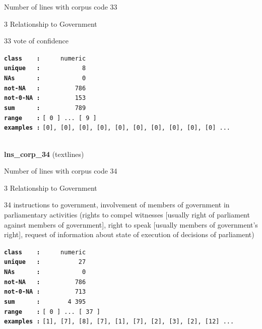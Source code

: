\documentclass[]{article}
\begin{document}
Number of lines with corpus code 33

3 Relationship to Government

33 vote of confidence

\textbf{\texttt{class\ \ \ \ :}} \texttt{~~~~~numeric}\\
\textbf{\texttt{unique\ \ \ :}} \texttt{~~~~~~~~~~~8}\\
\textbf{\texttt{NAs\ \ \ \ \ \ :}} \texttt{~~~~~~~~~~~0}\\
\textbf{\texttt{not-NA\ \ \ :}} \texttt{~~~~~~~~~786}\\
\textbf{\texttt{not-0-NA\ :}} \texttt{~~~~~~~~~153}\\
\textbf{\texttt{sum\ \ \ \ \ \ :}} \texttt{~~~~~~~~~789}\\
\textbf{\texttt{range\ \ \ \ :}}
\texttt{{[}\ 0\ {]}\ ...\ {[}\ 9\ {]}}\\
\textbf{\texttt{examples\ :}}
\texttt{{[}0{]},\ {[}0{]},\ {[}0{]},\ {[}0{]},\ {[}0{]},\ {[}0{]},\ {[}0{]},\ {[}0{]},\ {[}0{]},\ {[}0{]}\ ...}\\

~

\textbf{lns\_corp\_34} (textlines)

Number of lines with corpus code 34

3 Relationship to Government

34 instructions to government, involvement of members of government in
parliamentary activities (rights to compel witnesses {[}usually right of
parliament against members of government{]}, right to speak {[}usually
members of government's right{]}, request of information about state of
execution of decisions of parliament)

\textbf{\texttt{class\ \ \ \ :}} \texttt{~~~~~numeric}\\
\textbf{\texttt{unique\ \ \ :}} \texttt{~~~~~~~~~~27}\\
\textbf{\texttt{NAs\ \ \ \ \ \ :}} \texttt{~~~~~~~~~~~0}\\
\textbf{\texttt{not-NA\ \ \ :}} \texttt{~~~~~~~~~786}\\
\textbf{\texttt{not-0-NA\ :}} \texttt{~~~~~~~~~713}\\
\textbf{\texttt{sum\ \ \ \ \ \ :}} \texttt{~~~~~~~4~395}\\
\textbf{\texttt{range\ \ \ \ :}}
\texttt{{[}\ 0\ {]}\ ...\ {[}\ 37\ {]}}\\
\textbf{\texttt{examples\ :}}
\texttt{{[}1{]},\ {[}7{]},\ {[}8{]},\ {[}7{]},\ {[}1{]},\ {[}7{]},\ {[}2{]},\ {[}3{]},\ {[}2{]},\ {[}12{]}\ ...}\\
\end{document}
